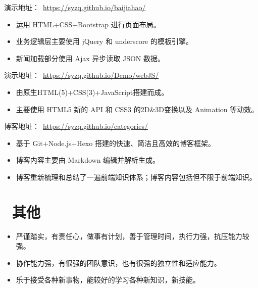 \documentclass{resume}
\begin{document}
\begin{onehalfspacing}
演示地址：\faLink \ \href{https://syzq.github.io/baijiahao/}{https://syzq.github.io/baijiahao/}
\begin{itemize}
  \item 运用 HTML+CSS+Bootstrap 进行页面布局。
  \item 业务逻辑层主要使用 jQuery 和 underscore 的模板引擎。
  \item 新闻加载部分使用 Ajax 异步读取 JSON 数据。
\end{itemize}
\end{onehalfspacing}

\begin{onehalfspacing}
演示地址：\faLink \ \href{https://syzq.github.io/Demo/webJS/}{https://syzq.github.io/Demo/webJS/}
\begin{itemize}
  \item 由原生HTML(5)+CSS(3)+JavaScript搭建而成。
  \item 主要使用 HTML5 新的 API 和 CSS3 的2D\&3D变换以及 Animation 等动效。
\end{itemize}
\end{onehalfspacing}

\begin{onehalfspacing}
博客地址：\faLink \ \href{https://syzq.github.io/categories/}{https://syzq.github.io/categories/}
\begin{itemize}
  \item 基于 Git+Node.js+Hexo 搭建的快速、简洁且高效的博客框架。
  \item 博客内容主要由 Markdown 编辑并解析生成。
  \item 博客重新梳理和总结了一遍前端知识体系；博客内容包括但不限于前端知识。
\end{itemize}
\end{onehalfspacing}


\section{\faInfoCircle\ 其他}
\begin{itemize}[parsep=0.5ex]
  \item 严谨踏实，有责任心，做事有计划，善于管理时间，执行力强，抗压能力较强。
  \item 协作能力强，有很强的团队意识，也有很强的独立性和适应能力。
  \item 乐于接受各种新事物，能较好的学习各种新知识，新技能。
\end{itemize}

%
%
\end{document}
